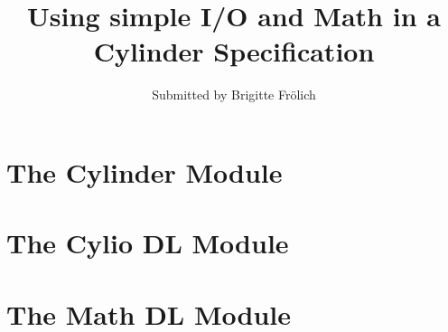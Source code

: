 \documentclass{article}
\begin{document}
\title{Using simple I/O and Math in a Cylinder Specification}
\author{Submitted by Brigitte Fr\"{o}lich}
\maketitle

\section{The Cylinder Module}

\begin{vdm}

\end{vdm}

\section{The Cylio DL Module}

\begin{vdm}

\end{vdm}

\section{The Math DL Module}

\begin{vdm}

\end{vdm}

\printindex
\end{document}
